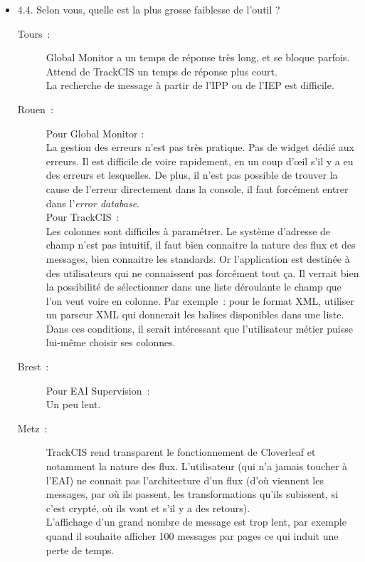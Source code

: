 \begin{itemize}
	  \item 4.4. Selon vous, quelle est la plus grosse faiblesse de l’outil ?
	  \begin{description}
	  	\item[Tours~:] Global Monitor a un temps de réponse très long, et se bloque
	  	parfois.\\
	  	Attend de TrackCIS un temps de réponse plus court.\\
	  	La recherche de message à partir de l’IPP ou de l’IEP est difficile.
	  	\item[Rouen~:] Pour Global Monitor :\\
		La gestion des erreurs n’est pas très pratique. Pas de widget dédié aux
		erreurs. Il est difficile de voire rapidement, en un coup d’œil s’il y a eu des
		erreurs et lesquelles. De plus, il n’est pas possible de trouver la cause de
		l’erreur directement dans la console, il faut forcément entrer dans
		l’\textit{error database}.\\
		Pour TrackCIS~:\\
		Les colonnes sont difficiles à paramétrer. Le système d’adresse de champ n’est
		pas intuitif, il faut bien connaitre la nature des flux et des messages, bien
		connaitre les standards. Or l’application est destinée à des utilisateurs qui
		ne connaissent pas forcément tout ça. Il verrait bien la possibilité de
		sélectionner dans une liste déroulante le champ que l’on veut voire en colonne.
		Par exemple~: pour le format XML, utiliser un parseur XML qui donnerait les
		balises disponibles dans une liste.\\
		Dans ces conditions, il serait intéressant que l’utilisateur métier puisse
		lui-même choisir ses colonnes.
	  	\item[Brest~:] Pour EAI Supervision~:\\
	  	Un peu lent.
	  	\item[Metz~:] TrackCIS rend transparent le fonctionnement de Cloverleaf et
	  	notamment la nature des flux. L’utilisateur (qui n’a jamais toucher à
	  	l’EAI) ne connait pas l’architecture d’un flux (d’où viennent les messages,
	  	par où ils passent, les transformations qu’ils subissent, si c’est crypté,
	  	où ils vont et s’il y a des retours).\\
		L’affichage d’un grand nombre de message est trop lent, par exemple quand il
		souhaite afficher 100 messages par pages ce qui induit une perte de temps.
	  \end{description}
	  

\end{itemize}

